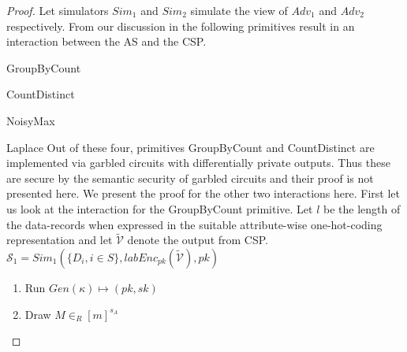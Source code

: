 \begin{proof} \begin{comment}The interactions between the \textsf{AS} and the \textsf{CSP} can be categorized into three types \begin{enumerate}\item Yao's garbled circuits - Primitives: NoisyMax, CountDistinct\item Decryption of masked data - Primitives: GroupBy \item Decryption of differentially private output- Primitives: Laplace \end{enumerate} Thus there are three possibilities for protocol $\pi_2$. For the garbled circuit based protocol $\pi_2$, the output of both the primitives NoisyMax and CountDistinct are differentially private by definition.  Hence by the standard semantic security of garbled circuits \cite{Yao, yao2}, the protocol is secure against a P.P.T adversary revealing nothing other than the differentially private  circuit outputs. 
We will discuss the simulators for the other two cases as follows starting of with the second case, i.e., when the \textsf{CSP} decrypts masked data.
\end{comment}
Let simulators $Sim_1$ and $Sim_2$ simulate the view of ${Adv}_1$ and $Adv_2$ respectively. 
From our discussion in the following primitives result in an interaction between the \textsf{AS} and the \textsf{CSP}.
\squishlistnum \item \textsf{GroupByCount} \item \textsf{CountDistinct} \item  \textsf{NoisyMax} \item {Laplace} \squishendnum 
Out of these four, primitives \textsf{GroupByCount} and \textsf{CountDistinct} are implemented via garbled circuits with differentially private outputs. Thus these are secure by the semantic security of garbled circuits and their proof is not presented here.
We present the proof for the other two interactions here. First let us look at the interaction for the \textsf{GroupByCount} primitive. Let $l$ be the length of the data-records when expressed in the suitable attribute-wise one-hot-coding representation and let $\tilde{\mathcal{V}}$ denote the output from \textsf{CSP}.  
$\mathcal{S}_1=Sim_1(\{D_i, i \in S\}, labEnc_{pk}(\tilde{\mathcal{V}}), pk)$
\begin{enumerate}\item Run $Gen(\kappa)\mapsto (pk,sk)$ 
\item Draw $M \in_R [m]^{s_A}$

\end{enumerate}
\end{proof}
